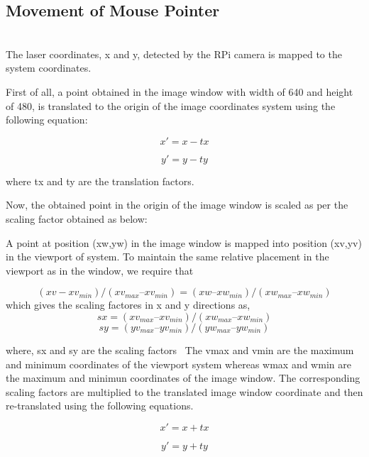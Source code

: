 \documentclass[12pt, a4paper]{article}
\begin{document}
\subsection{Movement of Mouse Pointer}
~\\
The laser coordinates, x and y, detected by the RPi camera is mapped to the system coordinates. 

First of all, a point obtained in the image window with width of 640 and height of 480, is translated to the origin of the image coordinates system using the following equation:

\begin{equation}
x' = x - tx
\end{equation}

\begin{equation}
y' = y - ty
\end{equation}

where tx and ty are the translation factors.

Now, the obtained point in the origin of the image window is scaled as per the scaling factor obtained as below:

A point at position (xw,yw) in the image window is mapped into position (xv,yv) in the viewport of system. To maintain the same relative placement in the viewport as in the window, we require that

\begin{equation}
 (xv -xv_{min})/(xv_{max} – xv_{min}) = (xw – xw_{min})/(xw_{max} – xw_{min})
\end{equation}
which gives the scaling factores in x and y directions as,
\begin{equation}
sx = (xv_{max} – xv_{min}) / (xw_{max} – xw_{min})
\end{equation}
\begin{equation}
sy = (yv_{max} – yv_{min}) / (yw_{max} – yw_{min})
\end{equation}

where, sx and sy are the scaling factors~\cite{hen}
The vmax and vmin are the maximum and minimum coordinates of the viewport system whereas wmax and wmin are the maximum and minimun coordinates of the image window. 
The corresponding scaling factors are multiplied to the translated image window coordinate and then re-translated using the following equations. 

\begin{equation}
x' = x + tx
\end{equation}

\begin{equation}
y' = y + ty
\end{equation}
\end{document}
